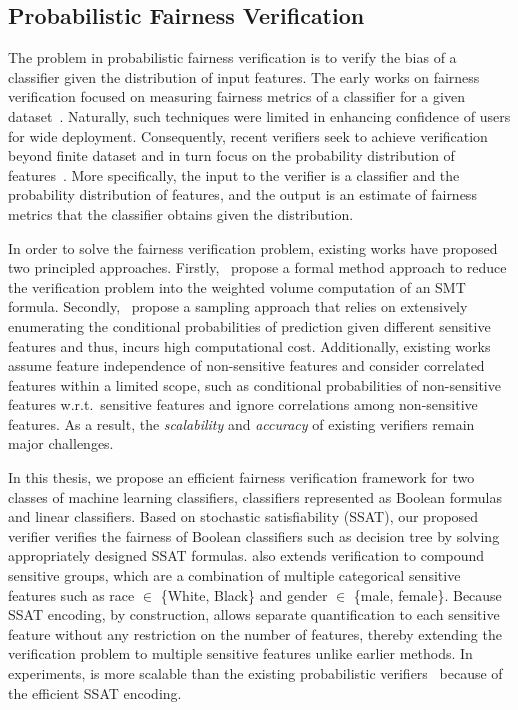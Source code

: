\subsection*{Probabilistic Fairness Verification} The problem in probabilistic fairness verification is to verify the bias of a classifier given the distribution of input features. The early works on fairness verification focused on measuring fairness metrics of a classifier for a given dataset~\cite{aif360-oct-2018}. Naturally, such techniques were limited in enhancing confidence of users for wide deployment. Consequently, recent verifiers seek to achieve verification beyond  finite dataset and in turn focus on the  probability distribution of features~\cite{albarghouthi2017fairsquare, bastani2019probabilistic}.  More specifically, the input to the verifier is a classifier and  the probability distribution of features, and the output is an estimate of fairness metrics that the classifier obtains given the distribution.


In order to solve the fairness verification problem, existing works have proposed two principled approaches.	Firstly,~\cite{albarghouthi2017fairsquare} propose a formal method approach to reduce the verification problem into the weighted volume computation of an SMT formula. Secondly,~\cite{bastani2019probabilistic} propose a sampling approach that relies on extensively enumerating the conditional probabilities of prediction given different sensitive features and thus, incurs high computational cost. Additionally, existing works assume feature independence of non-sensitive features and consider correlated features within a limited scope, such as conditional probabilities of non-sensitive features w.r.t.\ sensitive features and ignore correlations among non-sensitive features. As a result, the \textit{scalability} and \textit{accuracy} of existing  verifiers remain major challenges.


In this thesis, we propose an efficient fairness verification framework for two classes of machine learning classifiers, classifiers represented as Boolean formulas and linear classifiers. Based on stochastic satisfiability (SSAT)\cite{littman2001stochastic}, our proposed verifier {\justicia} verifies the fairness of Boolean classifiers such as decision tree by solving appropriately designed SSAT formulas. {\justicia} also extends verification to compound sensitive groups, which are a combination of multiple categorical sensitive features such as race $ \in $ \{White, Black\} and gender $ \in $ \{male, female\}. Because SSAT encoding, by construction, allows separate quantification to each sensitive feature without any restriction on the number of features, thereby extending the verification problem to multiple sensitive features unlike earlier methods. In experiments, {\justicia} is more scalable than the existing probabilistic verifiers~\cite{albarghouthi2017fairsquare,bastani2019probabilistic} because of the efficient SSAT encoding.


